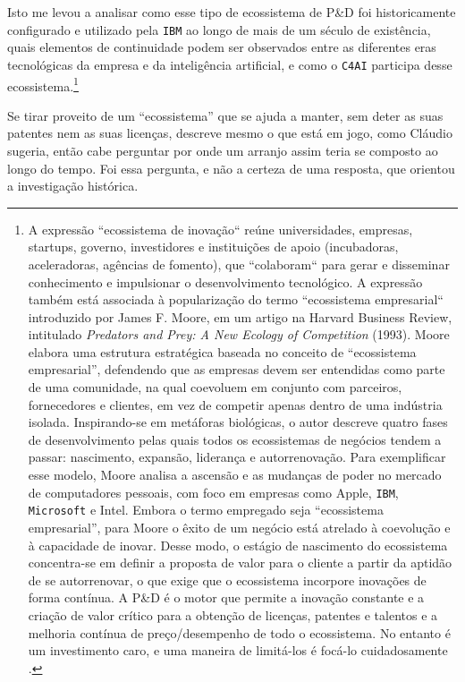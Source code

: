 Isto me levou a analisar como esse tipo de ecossistema de P\&D foi historicamente configurado e utilizado pela \texttt{IBM} ao longo de mais de um século de existência, quais elementos de continuidade podem ser observados entre as diferentes eras tecnológicas da empresa e da inteligência artificial, e como o \texttt{C4AI} participa desse ecossistema.\footnote{A expressão ``ecossistema de inovação`` reúne universidades, empresas, startups, governo, investidores e instituições de apoio (incubadoras, aceleradoras, agências de fomento), que ``colaboram`` para gerar e disseminar conhecimento e impulsionar o desenvolvimento tecnológico. A expressão também está associada à popularização do termo ``ecossistema empresarial`` introduzido por James F. Moore, em um artigo na Harvard Business Review, intitulado \textit{Predators and Prey: A New Ecology of Competition }(1993). Moore elabora uma estrutura estratégica baseada no conceito de \enquote{ecossistema empresarial}, defendendo que as empresas devem ser entendidas como parte de uma comunidade, na qual coevoluem em conjunto com parceiros, fornecedores e clientes, em vez de competir apenas dentro de uma indústria isolada. Inspirando-se em metáforas biológicas, o autor descreve quatro fases de desenvolvimento pelas quais todos os ecossistemas de negócios tendem a passar: nascimento, expansão, liderança e autorrenovação. Para exemplificar esse modelo, Moore analisa a ascensão e as mudanças de poder no mercado de computadores pessoais, com foco em empresas como Apple, \texttt{IBM}, \texttt{Microsoft} e Intel. Embora o termo empregado seja \enquote{ecossistema empresarial}, para Moore o êxito de um negócio está atrelado à coevolução e à capacidade de inovar. Desse modo, o estágio de nascimento do ecossistema concentra-se em definir a proposta de valor para o cliente a partir da aptidão de se autorrenovar, o que exige que o ecossistema incorpore inovações de forma contínua. A P\&D é o motor que permite a inovação constante e a criação de valor crítico para a obtenção de licenças, patentes e talentos e a melhoria contínua de preço/desempenho de todo o ecossistema. No entanto é um investimento caro, e uma maneira de limitá-los é focá-lo cuidadosamente \parencite{Moore1993PredatorsAP}.}

Se tirar proveito de um \enquote{ecossistema} que se ajuda a manter, sem deter as suas patentes nem as suas licenças, descreve mesmo o que está em jogo, como Cláudio sugeria, então cabe perguntar por onde um arranjo assim teria se composto ao longo do tempo. Foi essa pergunta, e não a certeza de uma resposta, que orientou a investigação histórica.

